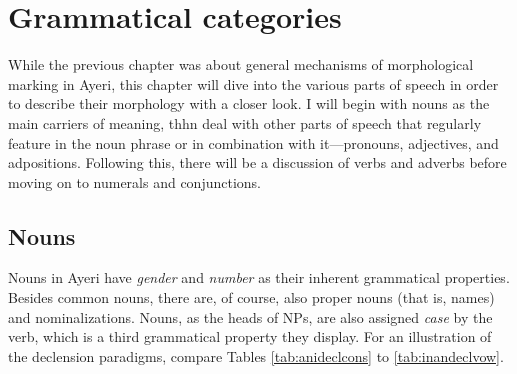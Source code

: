 \chapter{Grammatical categories}
\label{ch:gramcat}

While the previous chapter was about general mechanisms of morphological
marking in Ayeri, this chapter will dive into the various parts of speech in
order to describe their morphology with a closer look. I will begin with nouns
as the main carriers of meaning, thhn deal with other parts of speech that
regularly feature in the noun phrase or in combination with it---pronouns,
adjectives, and adpositions. Following this, there will be a discussion of
verbs and adverbs before moving on to numerals and conjunctions.

\section{Nouns}
\label{sec:nouns}

Nouns in Ayeri have \emph{gender} and \emph{number} as their inherent
grammatical properties. Besides common nouns, there are, of course, also proper
nouns (that is, names) and nominalizations. Nouns, as the heads of NPs, are
also assigned \emph{case} by the verb, which is a third grammatical property
they display. For an illustration of the declension paradigms, compare Tables
\ref{tab:anideclcons} to \ref{tab:inandeclvow}.


